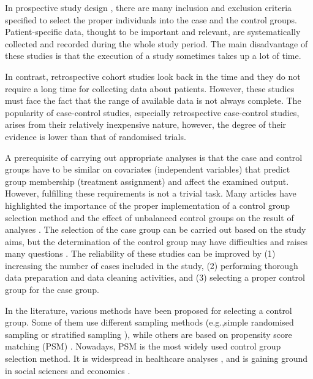 In prospective study design \cite{wacholder1992selection3, iwagami2022introduction}, there are many inclusion and exclusion criteria specified to select the proper individuals into the case and the control groups. Patient-specific data, thought to be important and relevant, are systematically collected and recorded during the whole study period. The main disadvantage of these studies is that the execution of a study sometimes takes up a lot of time.

In contrast, retrospective cohort studies \cite{wacholder1992selection3, iwagami2022introduction} look back in the time and they do not require a long time for collecting data about patients. However, these studies must face the fact that the range of available data is not always complete. The popularity of case-control studies, especially retrospective case-control studies, arises from their relatively inexpensive nature, however, the degree of their evidence is lower than that of randomised trials.

A prerequisite of carrying out appropriate analyses is that the case and control groups have to be similar on covariates (independent variables) that predict group membership (treatment assignment) and affect the examined output. However, fulfilling these requirements is not a trivial task. Many articles have highlighted the importance of the proper implementation of a control group selection method and the effect of unbalanced control groups on the result of analyses \cite{harris2002control, pell2008selection, behar2008effect, ripollone2018implications, moser2019out}. The selection of the case group can be carried out based on the study aims, but the determination of the control group may have difficulties and raises many questions \cite{wacholder1992selection, koepsell2014epidemiologic}. The reliability of these studies can be improved by (1) increasing the number of cases included in the study, (2) performing thorough data preparation and data cleaning activities, and (3) selecting a proper control group for the case group.

In the literature, various methods have been proposed for selecting a control group. Some of them use different sampling methods (e.g.,simple randomised sampling or stratified sampling \cite{jewell1985least, singh2003stratified}), while others are based on propensity score matching (PSM) \cite{rosenbaum1983central, austin2011introduction}. Nowadays, PSM \cite{rosenbaum1983central} is the most widely used control group selection method. It is widespread in healthcare analyses \cite{shin2015comparative, tokuda2019clinical, chuang2019acute}, and is gaining ground in social sciences \cite{thoemmes2011systematic, hwang2018rethinking, xu2020examining} and economics \cite{shipman2017propensity, peel2009propensity, cushman2017exchange, rosholm2019bridging}.

